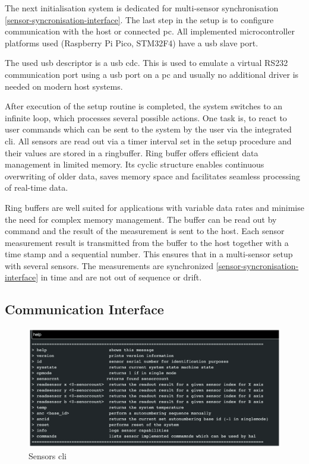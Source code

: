 The next initialisation system is dedicated for multi-sensor
synchronisation \ref{sensor-syncronisation-interface}. The last step in
the setup is to configure communication with the host or connected
\gls{pc}. All implemented microcontroller platforms used (Raspberry Pi
Pico, STM32F4) have a \gls{usb} slave port.

The used usb descriptor is a \gls{usb} \gls{cdc}. This is used to
emulate a virtual RS232 communication port using a \gls{usb} port on a
\gls{pc} and usually no additional driver is needed on modern host
systems.

After execution of the setup routine is completed, the system switches
to an infinite loop, which processes several possible actions. One task
is, to react to user commands which can be sent to the system by the
user via the integrated \gls{cli}. All sensors are read out via a timer
interval set in the setup procedure and their values are stored in a
ringbuffer. Ring buffer offers efficient data management in limited
memory. Its cyclic structure enables continuous overwriting of older
data, saves memory space and facilitates seamless processing of
real-time data.

Ring buffers are well suited for applications with variable data rates
and minimise the need for complex memory management. The buffer can be
read out by command and the result of the measurement is sent to the
host. Each sensor measurement result is transmitted from the buffer to
the host together with a time stamp and a sequential number. This
ensures that in a multi-sensor setup with several sensors. The
measurements are synchronized \ref{sensor-syncronisation-interface} in
time and are not out of sequence or drift.

\hypertarget{communication-interface}{%
\subsection{Communication Interface}\label{communication-interface}}

\begin{figure}
\centering
\includegraphics{./generated_images/border_Sensors_(+cli).png}
\caption{Sensors \gls{cli} \label{Sensors_(+cli).png}}
\end{figure}

